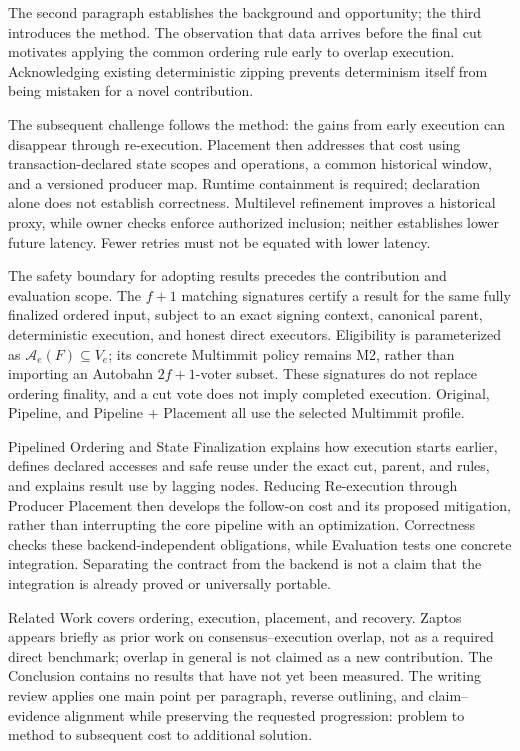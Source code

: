 \documentclass[11pt]{article}
\begin{document}
The second paragraph establishes the background and opportunity; the third introduces the method. The observation that data arrives before the final cut motivates applying the common ordering rule early to overlap execution. Acknowledging existing deterministic zipping prevents determinism itself from being mistaken for a novel contribution.

The subsequent challenge follows the method: the gains from early execution can disappear through re-execution. Placement then addresses that cost using transaction-declared state scopes and operations, a common historical window, and a versioned producer map. Runtime containment is required; declaration alone does not establish correctness. Multilevel refinement improves a historical proxy, while owner checks enforce authorized inclusion; neither establishes lower future latency. Fewer retries must not be equated with lower latency.

The safety boundary for adopting results precedes the contribution and evaluation scope. The \(f+1\) matching signatures certify a result for the same fully finalized ordered input, subject to an exact signing context, canonical parent, deterministic execution, and honest direct executors. Eligibility is parameterized as \(\mathcal{A}_e(F)\subseteq V_e\); its concrete Multimmit policy remains M2, rather than importing an Autobahn \(2f+1\)-voter subset. These signatures do not replace ordering finality, and a cut vote does not imply completed execution. Original, Pipeline, and Pipeline + Placement all use the selected Multimmit profile.

Pipelined Ordering and State Finalization explains how execution starts earlier, defines declared accesses and safe reuse under the exact cut, parent, and rules, and explains result use by lagging nodes. Reducing Re-execution through Producer Placement then develops the follow-on cost and its proposed mitigation, rather than interrupting the core pipeline with an optimization. Correctness checks these backend-independent obligations, while Evaluation tests one concrete integration. Separating the contract from the backend is not a claim that the integration is already proved or universally portable.

Related Work covers ordering, execution, placement, and recovery. Zaptos appears briefly as prior work on consensus--execution overlap, not as a required direct benchmark; overlap in general is not claimed as a new contribution. The Conclusion contains no results that have not yet been measured. The writing review applies one main point per paragraph, reverse outlining, and claim--evidence alignment while preserving the requested progression: problem  to  method  to  subsequent cost  to  additional solution. \citep{writingSkill}
\end{document}
